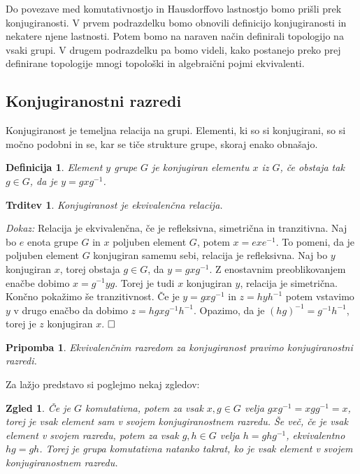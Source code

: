 \documentclass[a4paper,12pt]{article}
\def\qed{$\hfill\Box$}   %
\newtheorem{trditev}{Trditev}
\newtheorem{pripomba}{Pripomba}
\newtheorem{definicija}{Definicija}
\newtheorem{zgled}{Zgled}
\begin{document}
Do povezave med komutativnostjo in Hausdorffovo lastnostjo bomo prišli prek konjugiranosti.
V prvem podrazdelku bomo obnovili definicijo konjugiranosti in nekatere njene lastnosti. Potem bomo na naraven način definirali topologijo na vsaki grupi.
V drugem podrazdelku pa bomo videli, kako postanejo preko prej definirane topologije mnogi topološki in algebraični pojmi ekvivalenti.



\subsection{Konjugiranostni razredi}

Konjugiranost je temeljna relacija na grupi. Elementi, ki so si konjugirani, so si močno podobni in se, kar se tiče strukture grupe, skoraj enako obnašajo.

\begin{definicija}
    Element $y$ grupe $G$ je \emph{konjugiran} elementu $x$ iz $G$, če obstaja tak $g \in G$, da je $y = gxg^{-1}$.
\end{definicija}

\begin{trditev}
    Konjugiranost je ekvivalenčna relacija.
\end{trditev}

\noindent
{\em Dokaz:\/}
    Relacija je ekvivalenčna, če je refleksivna, simetrična in tranzitivna. Naj bo $e$ enota grupe $G$ in $x$ poljuben element $G$, potem $x = exe^{-1}$.
    To pomeni, da je poljuben element $G$ konjugiran samemu sebi, relacija je refleksivna.
    Naj bo $y$ konjugiran $x$, torej obstaja $g \in G$, da $y = gxg^{-1}$. Z enostavnim preoblikovanjem enačbe dobimo $x = g^{-1}yg$.
    Torej je tudi $x$ konjugiran $y$, relacija je simetrična.
    Končno pokažimo še tranzitivnost. Če je $y = gxg^{-1}$ in $z = hyh^{-1}$ potem vstavimo $y$ v drugo enačbo da dobimo $z = hgxg^{-1}h^{-1}$.
    Opazimo, da je $(hg)^{-1} = g^{-1}h^{-1}$, torej je $z$ konjugiran $x$.
\qed

\begin{pripomba}
    Ekvivalenčnim razredom za konjugiranost pravimo \emph{konjugiranostni razredi}.
\end{pripomba}

Za lažjo predstavo si poglejmo nekaj zgledov:

\begin{zgled}
        Če je $G$ komutativna, potem za vsak $x,g \in G$ velja $gxg^{-1} = xgg^{-1} = x$, torej je vsak element sam v svojem konjugiranostnem razredu.
        Še več, če je vsak element v svojem razredu, potem za vsak $g,h \in G$ velja $h = ghg^{-1}$, ekvivalentno $hg = gh$.
        Torej je grupa komutativna natanko takrat, ko je vsak element v svojem konjugiranostnem razredu.
\end{zgled}
\end{document}
